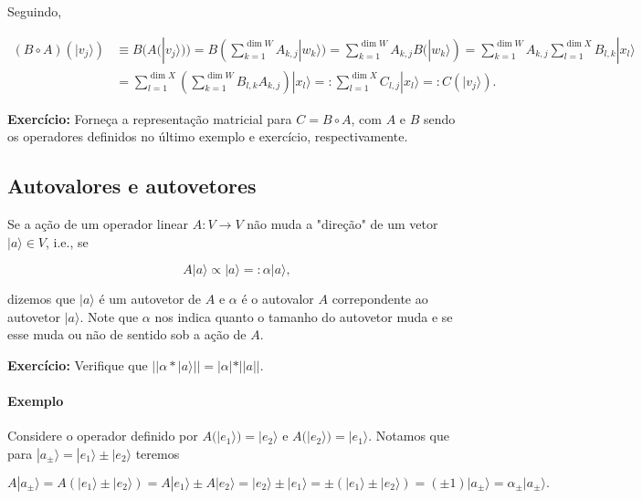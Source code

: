 \documentclass[11pt]{article}
\begin{document}
Seguindo,

\begin{align}
(B\circ A)(|v_{j}\rangle) & \equiv B(A(|v_{j}\rangle)) = B(\sum_{k=1}^{\dim W} A_{k,j}|w_{k}\rangle) = \sum_{k=1}^{\dim W} A_{k,j}B(|w_{k}\rangle) = \sum_{k=1}^{\dim W} A_{k,j}\sum_{l=1}^{\dim X}B_{l,k}|x_{l}\rangle \\
& = \sum_{l=1}^{\dim X}\left(\sum_{k=1}^{\dim W} B_{l,k}A_{k,j}\right)|x_{l}\rangle =: \sum_{l=1}^{\dim X}C_{l,j}|x_{l}\rangle =: C(|v_{j}\rangle).
\end{align}

\textbf{Exercício:} Forneça a representação matricial para
\(C=B\circ A\), com \(A\) e \(B\) sendo os operadores definidos no
último exemplo e exercício, respectivamente.

    \subsection{Autovalores e autovetores}\label{autovalores-e-autovetores}

Se a ação de um operador linear \(A:V\rightarrow V\) não muda a
"direção" de um vetor \(|a\rangle\in V\), i.e., se

\begin{equation}
A|a\rangle\propto |a\rangle =: \alpha|a\rangle,
\end{equation}

dizemos que \(|a\rangle\) é um autovetor de \(A\) e \(\alpha\) é o
autovalor \(A\) correpondente ao autovetor \(|a\rangle\). Note que
\(\alpha\) nos indica quanto o tamanho do autovetor muda e se esse muda
ou não de sentido sob a ação de \(A\).

\textbf{Exercício:} Verifique que
\(||\alpha*|a\rangle||=|\alpha|*||a||\).

\paragraph{Exemplo}\label{exemplo}

Considere o operador definido por
\(A(|e_{1}\rangle)=|e_{2}\rangle \text{ e } A(|e_{2}\rangle)=|e_{1}\rangle\).
Notamos que para \(|a_{\pm}\rangle=|e_{1}\rangle\pm|e_{2}\rangle\)
teremos

\begin{equation}
A|a_{\pm}\rangle = A(|e_{1}\rangle\pm|e_{2}\rangle) = A|e_{1}\rangle\pm A|e_{2}\rangle = |e_{2}\rangle\pm |e_{1}\rangle = \pm(|e_{1}\rangle \pm |e_{2}\rangle) = (\pm1)|a_{\pm}\rangle = \alpha_{\pm}|a_{\pm}\rangle.
\end{equation}
\end{document}
